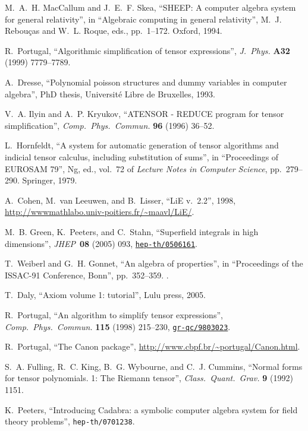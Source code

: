 \documentclass{elsart}
\begin{document}
\begin{thebibliography}{23}
M.~A.~H. MacCallum and J.~E.~F. Skea, ``{SHEEP: A computer algebra system for
  general relativity}'', in ``Algebraic computing in general relativity'',
  M.~J. {Rebou\c{c}as} and W.~L. Roque, eds., pp.~1--172.
\newblock Oxford, 1994.

R.~Portugal, ``Algorithmic simplification of tensor expressions'', {\em J.\
  Phys.} {\bf A32} (1999) 7779--7789.

A.~Dresse, ``Polynomial poisson structures and dummy variables in computer
  algebra'', PhD thesis, Universit\'e Libre de Bruxelles, 1993.

V.~A. Ilyin and A.~P. Kryukov, ``{ATENSOR} - {REDUCE} program for tensor
  simplification'', {\em Comp.\ Phys.\ Commun.} {\bf 96} (1996) 36--52.

L.~Hornfeldt, ``A system for automatic generation of tensor algorithms and
  indicial tensor calculus, including substitution of sums'', in ``Proceedings
  of EUROSAM 79'', Ng, ed., vol.~72 of {\em Lecture Notes in Computer Science},
  pp.~279--290.
\newblock Springer, 1979.

A.~Cohen, M.~van Leeuwen, and B.~Lisser, ``{LiE} v.~2.2'', 1998,
  \url{http://wwwmathlabo.univ-poitiers.fr/~maavl/LiE/}.

M.~B. Green, K.~Peeters, and C.~Stahn, ``Superfield integrals in high
  dimensions'', {\em JHEP\,} {\bf 08} (2005) 093,
\href{http://xxx.lanl.gov/abs/hep-th/0506161}{{\tt hep-th/0506161}}.

T.~Weiberl and G.~H. Gonnet, ``An algebra of properties'', in ``Proceedings of
  the ISSAC-91 Conference, Bonn'', pp.~352--359.
.

T.~Daly, ``Axiom volume 1: tutorial'', Lulu press, 2005.

R.~Portugal, ``An algorithm to simplify tensor expressions'', {\em Comp.\
  Phys.\ Commun.} {\bf 115} (1998) 215--230,
\href{http://xxx.lanl.gov/abs/gr-qc/9803023}{{\tt gr-qc/9803023}}.

R.~Portugal, ``{The Canon package}'',
  \url{http://www.cbpf.br/~portugal/Canon.html}.

S.~A. Fulling, R.~C. King, B.~G. Wybourne, and C.~J. Cummins, ``Normal forms
  for tensor polynomials. 1: The {Riemann} tensor'', {\em Class.\ Quant.\
  Grav.} {\bf 9} (1992)
1151.

K.~Peeters, ``{Introducing Cadabra: a symbolic computer algebra system for
  field theory problems}'', {\tt hep-th/0701238}.

\end{thebibliography}\endgroup
\end{document}
